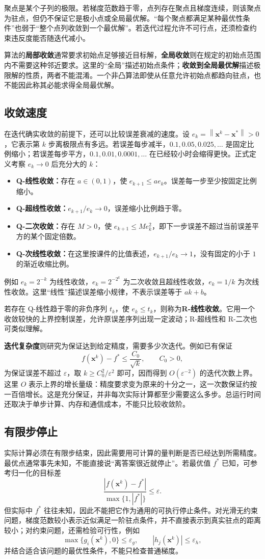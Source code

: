 \documentclass[UTF8,fontset=fandol,a4paper,12pt]{ctexart}
\newcommand{\vx}{\boldsymbol x}
\newcommand{\norm}[1]{\left\lVert#1\right\rVert}
\theoremstyle{definition}
\begin{document}
聚点是某个子列的极限。若梯度范数趋于零，点列存在聚点且梯度连续，则该聚点为驻点，但仍不保证它是极小点或全局最优解。“每个聚点都满足某种最优性条件”也弱于“整个点列收敛到一个最优解”。若迭代过程允许不可行点，还须检查约束违反度能否随迭代减小。

算法的\textbf{局部收敛}通常要求初始点足够接近目标解，\textbf{全局收敛}则在规定的初始点范围内不需要这种邻近要求。这里的“全局”描述初始点条件；\textbf{收敛到全局最优解}描述极限解的性质，两者不能混淆。一个非凸算法即使从任意允许初始点都趋向驻点，也不能因此称其必能求得全局最优解。

\subsection{收敛速度}
在迭代确实收敛的前提下，还可以比较误差衰减的速度。设 $e_k=\norm{\vx^k-\vx^*}>0$，它表示第 $k$ 步离极限点有多远。若误差每步减半，$0.1,0.05,0.025,\ldots$ 是固定比例缩小；若误差每步平方，$0.1,0.01,0.0001,\ldots$ 在已经较小时会缩得更快。正式定义考察 $e_k\to0$ 后充分大的 $k$：
\begin{itemize}
\item \textbf{Q-线性收敛：}存在 $a\in(0,1)$，使 $e_{k+1}\le a e_k$。误差每一步至少按固定比例缩小。
\item \textbf{Q-超线性收敛：}$e_{k+1}/e_k\to0$，误差缩小比例趋于零。
\item \textbf{Q-二次收敛：}存在 $M>0$，使 $e_{k+1}\le M e_k^2$，即下一步误差不超过当前误差平方的某个固定倍数。
\item \textbf{Q-次线性收敛：}在这里按课件的比值表述，$e_{k+1}/e_k\to1$，没有固定的小于 $1$ 的渐近收缩比例。
\end{itemize}
例如 $e_k=2^{-k}$ 为线性收敛，$e_k=2^{-2^k}$ 为二次收敛且超线性收敛，$e_k=1/k$ 为次线性收敛。这里“线性”描述误差缩小规律，不表示误差等于 $ak+b$。

若存在 Q-线性趋于零的非负序列 $t_k$，使 $e_k\le t_k$，则称为\textbf{R-线性收敛}。它用一个收敛较快的上界控制误差，允许原误差序列出现一定波动；R-超线性和 R-二次也可类似理解。

\textbf{迭代复杂度}则研究为保证达到给定精度，需要多少次迭代。例如已有保证
\[
 f(\vx^k)-f^*\le\frac{C_0}{\sqrt{k}},\qquad C_0>0,
\]
为保证误差不超过 $\varepsilon$，取 $k\ge C_0^2/\varepsilon^2$ 即可，因而得到 $O(\varepsilon^{-2})$ 的迭代次数上界。这里 $O$ 表示上界的增长量级：精度要求变为原来的十分之一，这一次数保证约按一百倍增长。这是充分保证，并非每次实际计算都至少需要这么多步。总运行时间还取决于单步计算、内存和通信成本，不能只比较收敛阶。

\subsection{有限步停止}
实际计算必须在有限步结束，因此需要用可计算的量判断是否已经达到所需精度。最优点通常事先未知，不能直接说“离答案很近就停止”。若最优值 $f^*$ 已知，可参考归一化的目标差
\[
 \frac{|f(\vx^k)-f^*|}{\max\{1,|f^*|\}}\le\varepsilon.
\]
但实际中 $f^*$ 往往未知，因此不能把它作为通用的可执行停止条件。对光滑无约束问题，梯度范数较小表示近似满足一阶驻点条件，并不直接表示到真实驻点的距离较小；对约束问题，还需检验可行性，例如
\[
 \max\{g_i(\vx^k),0\}\le\varepsilon_g,\qquad
 |h_j(\vx^k)|\le\varepsilon_h,
\]
并结合适合该问题的最优性条件，不能只检查普通梯度。
\end{document}
